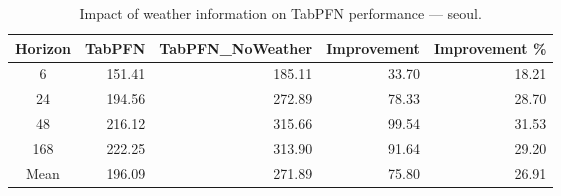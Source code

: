 \begin{table}
\centering
\caption{Impact of weather information on TabPFN performance — seoul.}
\label{tab:tabpfn_weather_seoul}
\begin{tabular}{crrrr}
\toprule
Horizon & TabPFN & TabPFN\_NoWeather & Improvement & Improvement \% \\
\midrule
6 & 151.41 & 185.11 & 33.70 & 18.21 \\
24 & 194.56 & 272.89 & 78.33 & 28.70 \\
48 & 216.12 & 315.66 & 99.54 & 31.53 \\
168 & 222.25 & 313.90 & 91.64 & 29.20 \\
\midrule
Mean & 196.09 & 271.89 & 75.80 & 26.91 \\
\bottomrule
\end{tabular}
\end{table}
